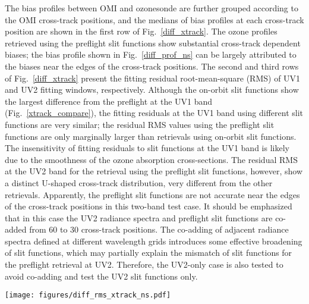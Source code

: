 \documentclass[amt,manuscript]{copernicus}
\begin{document}
The bias profiles between OMI and ozonesonde are further grouped according to the OMI cross-track positions, and the medians of bias profiles at each cross-track position are shown in the first row of Fig.~\ref{diff_xtrack}. The ozone profiles retrieved using the preflight slit functions show substantial cross-track dependent biases; the bias profile shown in Fig.~\ref{diff_prof_ns} can be largely attributed to the biases near the edges of the cross-track positions. The second and third rows of Fig.~\ref{diff_xtrack} present the fitting residual root-mean-square (RMS) of UV1 and UV2 fitting windows, respectively. Although the on-orbit slit functions show the largest difference from the preflight at the UV1 band (Fig.~\ref{xtrack_compare}), the fitting residuals at the UV1 band using different slit functions are very similar; the residual RMS values using the preflight slit functions are only marginally larger than retrievals using on-orbit slit functions. The insensitivity of fitting residuals to slit functions at the UV1 band is likely due to the smoothness of the ozone absorption cross-sections. The residual RMS at the UV2 band for the retrieval using the preflight slit functions, however, show a distinct U-shaped cross-track distribution, very different from the other retrievals. Apparently, the preflight slit functions are not accurate near the edges of the cross-track positions in this two-band test case. It should be emphasized that in this case the UV2 radiance spectra and preflight slit functions are co-added from 60 to 30 cross-track positions. The co-adding of adjacent radiance spectra defined at different wavelength grids introduces some effective broadening of slit functions, which may partially explain the mismatch of slit functions for the preflight retrieval at UV2. Therefore, the UV2-only case is also tested to avoid co-adding and test the UV2 slit functions only.


\begin{figure*}[tbhp]
\texttt{[image: figures/diff\_rms\_xtrack\_ns.pdf]}
\caption{(First row)  Medians of difference profiles between OMI and ozonesondes at each cross-track position. (Second row) Distributions of fitting residual RMS at each cross track position for the UV1 band. (Third row) Same as the second row but for the UV2 band. The mean and standard derivation of all residual RMS are labeled in each subplot at row 2--3.}
\label{diff_xtrack}
\end{figure*}
\end{document}

